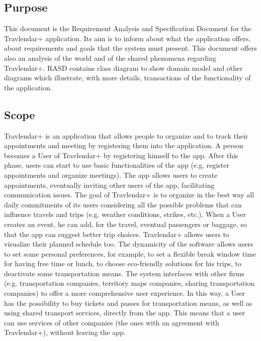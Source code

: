 \subsection{Purpose}
This document is the Requirement Analysis and Specification Document for the Travlendar+ application. Its aim is
to inform about what the application offers, about requirements and goals that the system must present. This document offers also an analysis of the world and of the shared phenomena regarding Travlendar+. RASD contains class diagram to show domain model and other diagrams which illustrate, with more details, transactions of the functionality of the application.
\subsection{Scope}
Travlendar+ is an application that allows people to organize and to track their appointments and meeting by 
registering them into the application. A person becomes a User of Travlendar+ by registering himself to the app. After this phase, users can start to use basic functionalities of the app (e.g. register appointments and organize meetings).\newline 
The app allows users to create appointments, eventually inviting other users of the app, facilitating communication issues.
The goal of Travlendar+ is to organize in the best way all daily commitments of its users considering all the possible problems that can influence travels and trips (e.g. weather conditions, strikes, etc.).\newline
When a User creates an event, he can add, for the travel, eventual passengers or baggage, so that the app can suggest better trip choices. Travlendar+ allows users to visualize their planned schedule too.\newline 
The dynamicity of the software allows users to set some personal preferences, for example, to set a flexible break window time for having free time or lunch, to choose eco-friendly solutions for his trips, to deactivate some transportation means.\newline 
The system interfaces with other firms (e.g. transportation companies, territory maps companies, sharing transportation companies) to offer a more comprehensive user experience. In this way, a User has the possibility to buy tickets and passes for transportation means, as well as using shared transport services, directly from the app.
This means that a user can use services of other companies (the ones with an agreement with Travlendar+), without leaving the app.

